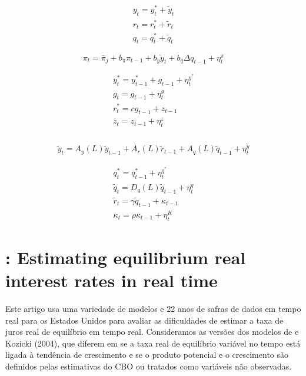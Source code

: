 $$
\begin{array}{l}
y_{t}=y_{t}^{*}+\tilde{y}_{t} \\
r_{t}=r_{t}^{*}+\tilde{r}_{t} \\
q_{t}=q_{t}^{*}+\tilde{q}_{t}
\end{array}
$$

$$
\pi_{t}=\bar{\pi}_{j}+b_{\pi} \pi_{t-1}+b_{y} \tilde{y}_{t}+b_{q} \Delta q_{t-1}+\eta_{t}^{\pi}
$$

$$
\begin{array}{l}
y_{t}^{*}=y_{t-1}^{*}+g_{t-1}+\eta_{t}^{y^{*}} \\
g_{t}=g_{t-1}+\eta_{t}^{g} \\
r_{t}^{*}=c g_{t-1}+z_{t-1} \\
z_{t}=z_{t-1}+\eta_{t}^{z} \\
\end{array}
$$


$$
\begin{array}{l}
\tilde{y}_{t}=A_{y}(L) \tilde{y}_{t-1}+A_{r}(L) \tilde{r}_{t-1}+A_{q}(L) \tilde{q}_{t-1}+\eta_{t}^{\tilde{y}}
\end{array}
$$

$$
\begin{array}{l}
q_{t}^{*}=q_{t-1}^{*}+\eta_{t}^{q^{*}}  \\
\tilde{q}_{t}=D_{q}(L) \tilde{q}_{t-1}+\eta_{t}^{\dot{q}} \\
\tilde{r}_{t}=\gamma \tilde{q}_{t-1}+\kappa_{t-1} \\
\kappa_{t}=\rho \kappa_{t-1}+\eta_{t}^{K}
\end{array}
$$
%
%
\section{\citet{Clark:2005}: Estimating equilibrium real interest rates in real time}
Este artigo usa uma variedade de modelos e 22 anos de safras de dados em tempo real para os Estados Unidos para avaliar as dificuldades de estimar a taxa de juros real de equilíbrio em tempo real. Consideramos as versões dos modelos de \citet{LW:2003} e Kozicki (2004), que diferem em se a taxa real de equilíbrio variável no tempo está ligada à tendência de crescimento e se o produto potencial e o crescimento são definidos pelas estimativas do CBO ou tratados como variáveis não observadas.

